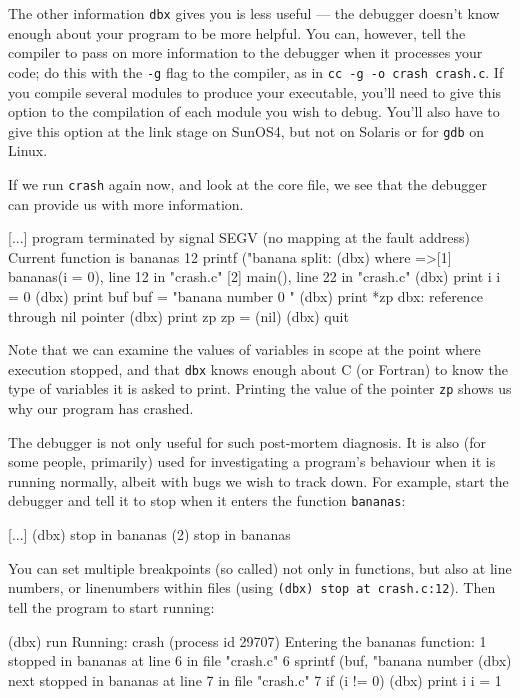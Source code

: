 \documentclass[11pt,oneside,chapters]{starlink}
\begin{document}
The other information \texttt{dbx} gives you is less
useful --- the debugger doesn't know enough about your
program to be more helpful.  You can, however, tell the
compiler to pass on more information to the debugger when
it processes your code; do this with the \texttt{-g}
flag to the compiler, as in \texttt{cc -g -o crash crash.c}.
If you compile several modules to produce
your executable, you'll need to give this option to the
compilation of each module you wish to debug.  You'll also
have to give this option at the link stage on SunOS4, but
not on Solaris or for \texttt{gdb} on Linux.

If we run \texttt{crash} again now, and look at the core file, we see
that the debugger can provide us with more information.

\begin{terminalv}
[...]
program terminated by signal SEGV (no mapping at the fault address)
Current function is bananas
12           printf ("banana split: %
(dbx) where
=>[1] bananas(i = 0), line 12 in "crash.c"
[2] main(), line 22 in "crash.c"
(dbx) print i
i = 0
(dbx) print buf
buf = "banana number 0
"
(dbx) print *zp
dbx: reference through nil pointer
(dbx) print zp
zp = (nil)
(dbx) quit
\end{terminalv}

Note that we can examine the values of variables in scope
at the point where execution stopped, and that
\texttt{dbx} knows enough about C (or Fortran) to know
the type of variables it is asked to print.  Printing the
value of the pointer \texttt{zp} shows us why our
program has crashed.

The debugger is not only useful for such post-mortem
diagnosis.  It is also (for some people, primarily) used
for investigating a program's behaviour when it is running
normally, albeit with bugs we wish to track down.  For
example, start the debugger and tell it to stop when it
enters the function \texttt{bananas}:

\begin{terminalv}
[...]
(dbx) stop in bananas
(2) stop in bananas
\end{terminalv}

You can set multiple breakpoints (so called) not only in functions,
but also at line numbers, or linenumbers within files (using
\texttt{(dbx) stop at crash.c:12}).  Then tell the
program to start running:

\begin{terminalv}
(dbx) run
Running: crash
(process id 29707)
Entering the bananas function: 1
stopped in bananas at line 6 in file "crash.c"
6       sprintf (buf, "banana number %
(dbx) next
stopped in bananas at line 7 in file "crash.c"
7       if (i != 0)
(dbx) print i
i = 1
\end{terminalv}
\end{document}

